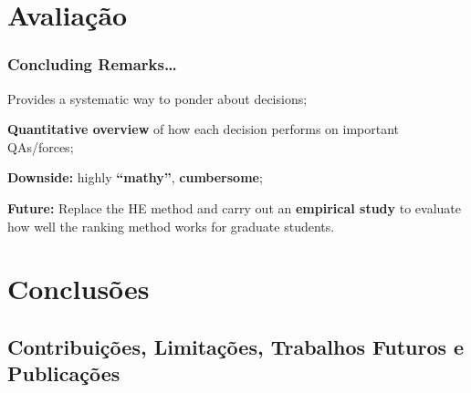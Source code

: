 \documentclass{beamer}
\begin{document}

\section{Avaliação}
\label{sec:wrapping_up}

\begin{frame}\frametitle{Concluding Remarks\ldots}
  \begin{itemize}
    \begin{minipage}{9.8cm}\item Provides a systematic way to ponder about decisions;\vspace{0.2cm}\end{minipage}
    \begin{minipage}{9.8cm}\item \textbf{Quantitative overview} of how each decision performs on 
    important QAs/forces;\vspace{0.2cm}\end{minipage}
    \begin{minipage}{9.8cm}\item \textbf{Downside:} highly \textbf{``mathy''}, \textbf{cumbersome};\vspace{0.2cm}\end{minipage}
    \begin{minipage}{9.8cm}\item \textbf{Future:} 
    Replace the HE method and carry out an \textbf{empirical study} to evaluate how well the ranking method works for graduate students.\vspace{0.2cm}\end{minipage} 
  \end{itemize}
\end{frame}

\section{Conclusões}
\subsection{Contribuições, Limitações, Trabalhos Futuros e Publicações}
\end{document}
